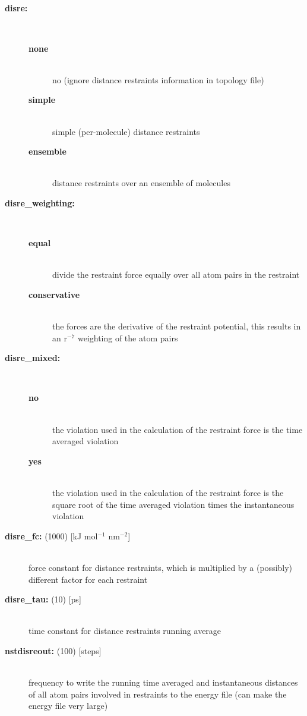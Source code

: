 \subsection{}
\begin{description}
\item[{\bf disre:}]\mbox{}\\
\vspace{-2ex}\begin{description}
\item[{\bf none}]\mbox{}\\
no  (ignore distance
restraints information in topology file)
\item[{\bf simple}]\mbox{}\\
simple (per-molecule) distance restraints
\item[{\bf ensemble}]\mbox{}\\
distance restraints over an ensemble of molecules
\end{description}
\item[{\bf disre\_weighting:}]\mbox{}\\
\vspace{-2ex}\begin{description}
\item[{\bf equal}]\mbox{}\\
divide the restraint force equally over all atom pairs in the restraint
\item[{\bf conservative}]\mbox{}\\
the forces are the derivative of the restraint potential,
this results in an r$^{-7}$ weighting of the atom pairs
\end{description}
\item[{\bf disre\_mixed:}]\mbox{}\\
\vspace{-2ex}\begin{description}
\item[{\bf no}]\mbox{}\\
the violation used in the calculation of the restraint force is the
time averaged violation 
\item[{\bf yes}]\mbox{}\\
the violation used in the calculation of the restraint force is the
square root of the time averaged violation times the instantaneous violation 
\end{description}
\item[{\bf disre\_fc: }(1000) {[kJ mol$^{-1}$ nm$^{-2}$]}]\mbox{}\\
force constant for distance restraints, which is multiplied by a
(possibly) different factor for each restraint
\item[{\bf disre\_tau: }(10) {[ps]}]\mbox{}\\
time constant for distance restraints running average
\item[{\bf nstdisreout: }(100) {[steps]}]\mbox{}\\
frequency to write the running time averaged and instantaneous distances
of all atom pairs involved in restraints to the energy file
(can make the energy file very large)
\end{description}

